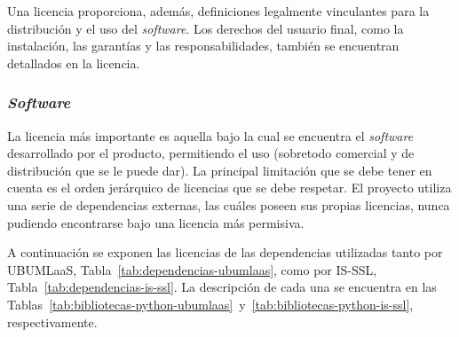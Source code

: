 Una licencia proporciona, además, definiciones legalmente vinculantes para la distribución y el uso del \textit{software}. Los derechos del usuario final, como la instalación,  las garantías y las responsabilidades, también se encuentran detallados en la licencia.


\subsubsection{\textit{Software}}
La licencia más importante es aquella bajo la cual se encuentra el \textit{software} desarrollado por el producto,  permitiendo el uso (sobretodo comercial y de distribución que se le puede dar). La principal limitación que se debe tener en cuenta es el orden jerárquico de licencias que se debe respetar. El proyecto utiliza una serie de dependencias externas, las cuáles poseen sus propias licencias, nunca pudiendo encontrarse bajo una licencia más permisiva.

A continuación se exponen las licencias de las dependencias utilizadas tanto por UBUMLaaS, Tabla~\ref{tab:dependencias-ubumlaas}, como por IS-SSL, Tabla~\ref{tab:dependencias-is-ssl}. La descripción de cada una se encuentra en las Tablas~\ref{tab:bibliotecas-python-ubumlaas}~y~\ref{tab:bibliotecas-python-is-ssl}, respectivamente.

